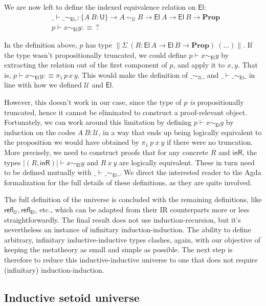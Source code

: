 \documentclass[autoref]{llncs}
\newcommand{\setoidU}{\mathcal{U}}
\newcommand{\mProp}{\mathbf{Prop}}
\newcommand{\U}{\textsf{U}}
\newcommand{\El}{\textsf{El}}
\newcommand{\reflu}{\textsf{refl}_\setoidU}
\newcommand{\reflel}{\textsf{refl}_\El}
\begin{document}
We are now left to define the indexed equivalence relation on $\El$:
\vspace{-0.2em}
\begin{align*}
  & \_\vdash\_\sim_{\El}\_ : \{A\ B : \U\} \to A\ \sim_{\setoidU}\ B \to \El\ A \to \El\ B \to \mProp \\
  & p \vdash x \sim_{\El} y :\equiv \ ?
\end{align*}

In the definition above, $p$ has type $\parallel \Sigma\ (R: \El\,A \to \El\,B \to
\mProp)\ (...) \parallel$. If the type wasn't propositionally truncated, we could define
$p \vdash x \sim_{\El} y$ by extracting the relation out of the first component
of $p$, and apply it to $x, y$. That is, $p \vdash x \sim_{\El} y :\equiv
\pi_1\,p\,x\,y$. This would make the definition of $\_\sim_\setoidU\_$ and
$\_\vdash\_\sim_{\El}\_$ in line with how we defined $\setoidU$ and $\El$.

However, this doesn't work in our case, since the type of $p$ \emph{is}
propositionally truncated, hence it cannot be eliminated to construct a
proof-relevant object.
%
Fortunately, we can work around this limitation by defining $p \vdash x
\sim_{\El} y$ by induction on the codes $A\ B : \setoidU$, in a way that ends
up being logically equivalent to the proposition we would have obtained by
$\pi_1\ p\ x\ y$ if there were no truncation.
%
More precisely, we need to construct proofs that for any concrete $R$ and
$\mathsf{inR}$, the types $| (R, \mathsf{inR}) | \vdash x \sim_{\El} y$ and $R\ x\ y$
are logically equivalent. These in turn need to be defined mutually with
$\_\vdash\_\sim_{\El}\_$. We direct the interested reader to the Agda
formalization for the full details of these definitions, as they are quite
involved.

The full definition of the universe is concluded with the remaining definitions,
like $\reflu, \reflel$, etc., which can be adapted from their IR counterparts
more or less straightforwardly. The final result does not use
induction-recursion, but it's nevertheless an instance of infinitary
induction-induction. The ability to define arbitrary, infinitary
inductive-inductive types clashes, again, with our objective of keeping the
metatheory as small and simple as possible. The next step is therefore to reduce
this inductive-inductive universe to one that does not require (infinitary)
induction-induction.

\subsection{Inductive setoid universe}
\end{document}
